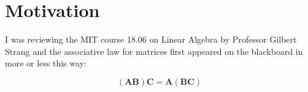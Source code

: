\documentclass[10pt,twocolumn]{article}
\begin{document}



\vspace{10mm}

\setlength{\parindent}{0cm}

\fontsize{14}{10}\selectfont {Kamila Zdybał}

\vspace{2mm}

\fontsize{8}{10}

\setlength{\parskip}{1em}
\renewcommand{\baselinestretch}{1.0}

\section*{Motivation}\label{chap:motivation}

I was reviewing the MIT course 18.06 on Linear Algebra by Professor Gilbert Strang and the associative law for matrices first appeared on the blackboard in more or less this way:

\begin{equation} \label{eq:proof}
(\bm{A} \bm{B}) \bm{C} = \bm{A} (\bm{B} \bm{C}) 
\end{equation}
\end{document}
